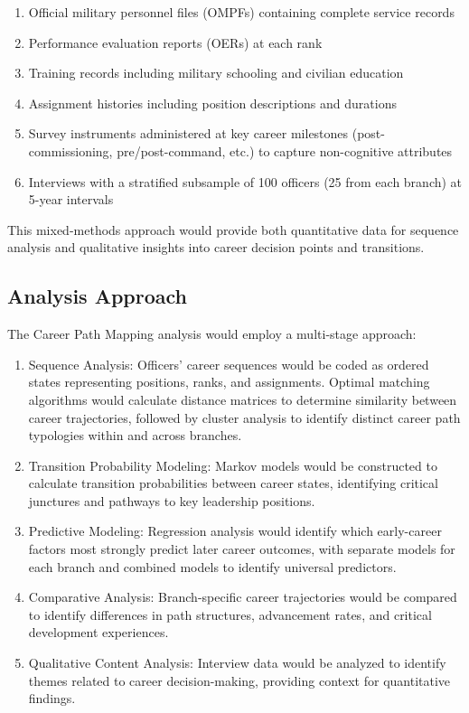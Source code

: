 \documentclass{article}
\begin{document}
\begin{enumerate}
\item Official military personnel files (OMPFs) containing complete service records
\item Performance evaluation reports (OERs) at each rank
\item Training records including military schooling and civilian education
\item Assignment histories including position descriptions and durations
\item Survey instruments administered at key career milestones (post-commissioning, pre/post-command, etc.) to capture non-cognitive attributes
\item Interviews with a stratified subsample of 100 officers (25 from each branch) at 5-year intervals
\end{enumerate}

This mixed-methods approach would provide both quantitative data for sequence analysis and qualitative insights into career decision points and transitions.

\subsection{Analysis Approach}
The Career Path Mapping analysis would employ a multi-stage approach:

\begin{enumerate}
\item Sequence Analysis: Officers' career sequences would be coded as ordered states representing positions, ranks, and assignments. Optimal matching algorithms would calculate distance matrices to determine similarity between career trajectories, followed by cluster analysis to identify distinct career path typologies within and across branches.

\item Transition Probability Modeling: Markov models would be constructed to calculate transition probabilities between career states, identifying critical junctures and pathways to key leadership positions.

\item Predictive Modeling: Regression analysis would identify which early-career factors most strongly predict later career outcomes, with separate models for each branch and combined models to identify universal predictors.

\item Comparative Analysis: Branch-specific career trajectories would be compared to identify differences in path structures, advancement rates, and critical development experiences.

\item Qualitative Content Analysis: Interview data would be analyzed to identify themes related to career decision-making, providing context for quantitative findings.
\end{enumerate}
\end{document}
